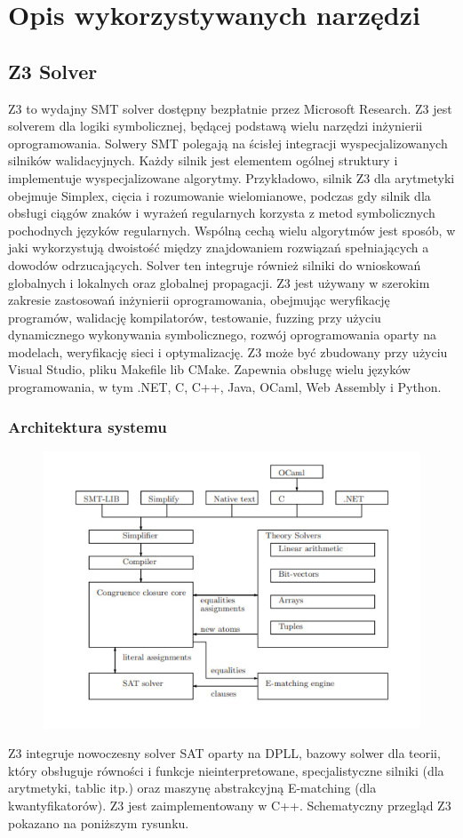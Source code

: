  

\chapter{Opis wykorzystywanych narzędzi}

\section{Z3 Solver}
Z3 to wydajny SMT solver dostępny bezpłatnie przez Microsoft Research. Z3 jest solverem dla logiki symbolicznej, będącej podstawą wielu narzędzi inżynierii oprogramowania. Solwery SMT polegają na ścisłej integracji wyspecjalizowanych silników walidacyjnych. Każdy silnik jest elementem ogólnej struktury i implementuje wyspecjalizowane algorytmy. Przykładowo, silnik Z3 dla arytmetyki obejmuje Simplex, cięcia i rozumowanie wielomianowe, podczas gdy silnik dla obsługi ciągów znaków i wyrażeń regularnych korzysta z metod symbolicznych pochodnych języków regularnych. Wspólną cechą wielu algorytmów jest sposób, w jaki wykorzystują dwoistość między znajdowaniem rozwiązań spełniających a dowodów odrzucających. Solver ten integruje również silniki do wnioskowań globalnych i lokalnych oraz globalnej propagacji.
Z3 jest używany w szerokim zakresie zastosowań inżynierii oprogramowania, obejmując weryfikację programów, walidację kompilatorów, testowanie, fuzzing przy użyciu dynamicznego wykonywania symbolicznego, rozwój oprogramowania oparty na modelach, weryfikację sieci i optymalizację.
Z3 może być zbudowany przy użyciu Visual Studio, pliku Makefile lib CMake. Zapewnia obsługę wielu języków programowania, w tym .NET, C, C++, Java, OCaml, Web Assembly i Python.

\subsection{Architektura systemu}
	\begin{figure}
	\centering
	\includegraphics[width=0.7\linewidth]{screenshot001}
	\caption{}
	\label{fig:screenshot001}
	\end{figure}
Z3 integruje nowoczesny solver SAT oparty na DPLL, bazowy solwer dla teorii, który obsługuje równości i funkcje nieinterpretowane, specjalistyczne silniki (dla arytmetyki, tablic itp.) oraz maszynę abstrakcyjną E-matching (dla kwantyfikatorów). Z3 jest zaimplementowany w C++. Schematyczny przegląd Z3 pokazano na poniższym rysunku.


